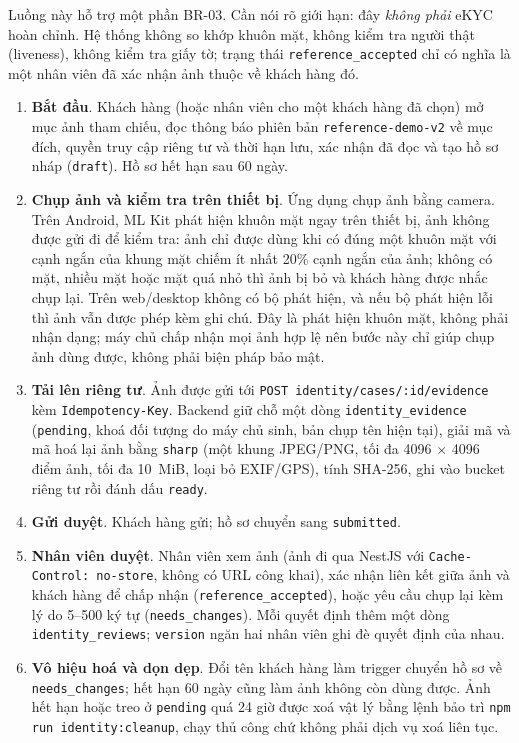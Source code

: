 Luồng này hỗ trợ một phần BR-03. Cần nói rõ giới hạn: đây \emph{không phải} eKYC hoàn chỉnh. Hệ thống không so khớp khuôn mặt, không kiểm tra người thật (liveness), không kiểm tra giấy tờ; trạng thái \texttt{reference\_\allowbreak{}accepted} chỉ có nghĩa là một nhân viên đã xác nhận ảnh thuộc về khách hàng đó.
\begin{enumerate}
  \item \textbf{Bắt đầu}. Khách hàng (hoặc nhân viên cho một khách hàng đã chọn) mở mục ảnh tham chiếu, đọc thông báo phiên bản \texttt{reference-\allowbreak{}demo-\allowbreak{}v2} về mục đích, quyền truy cập riêng tư và thời hạn lưu, xác nhận đã đọc và tạo hồ sơ nháp (\texttt{draft}). Hồ sơ hết hạn sau 60 ngày.
  \item \textbf{Chụp ảnh và kiểm tra trên thiết bị}. Ứng dụng chụp ảnh bằng camera. Trên Android, ML Kit phát hiện khuôn mặt ngay trên thiết bị, ảnh không được gửi đi để kiểm tra: ảnh chỉ được dùng khi có đúng một khuôn mặt với cạnh ngắn của khung mặt chiếm ít nhất 20\% cạnh ngắn của ảnh; không có mặt, nhiều mặt hoặc mặt quá nhỏ thì ảnh bị bỏ và khách hàng được nhắc chụp lại. Trên web/desktop không có bộ phát hiện, và nếu bộ phát hiện lỗi thì ảnh vẫn được phép kèm ghi chú. Đây là phát hiện khuôn mặt, không phải nhận dạng; máy chủ chấp nhận mọi ảnh hợp lệ nên bước này chỉ giúp chụp ảnh dùng được, không phải biện pháp bảo mật.
  \item \textbf{Tải lên riêng tư}. Ảnh được gửi tới \texttt{POST identity/\allowbreak{}cases/\allowbreak{}:id/\allowbreak{}evidence} kèm \texttt{Idempotency-\allowbreak{}Key}. Backend giữ chỗ một dòng \texttt{identity\_\allowbreak{}evidence} (\texttt{pending}, khoá đối tượng do máy chủ sinh, bản chụp tên hiện tại), giải mã và mã hoá lại ảnh bằng \texttt{sharp} (một khung JPEG/PNG, tối đa 4096 $\times$ 4096 điểm ảnh, tối đa 10~MiB, loại bỏ EXIF/GPS), tính SHA-256, ghi vào bucket riêng tư rồi đánh dấu \texttt{ready}.
  \item \textbf{Gửi duyệt}. Khách hàng gửi; hồ sơ chuyển sang \texttt{submitted}.
  \item \textbf{Nhân viên duyệt}. Nhân viên xem ảnh (ảnh đi qua NestJS với \texttt{Cache-\allowbreak{}Control: no-\allowbreak{}store}, không có URL công khai), xác nhận liên kết giữa ảnh và khách hàng để chấp nhận (\texttt{reference\_\allowbreak{}accepted}), hoặc yêu cầu chụp lại kèm lý do 5--500 ký tự (\texttt{needs\_\allowbreak{}changes}). Mỗi quyết định thêm một dòng \texttt{identity\_\allowbreak{}reviews}; \texttt{version} ngăn hai nhân viên ghi đè quyết định của nhau.
  \item \textbf{Vô hiệu hoá và dọn dẹp}. Đổi tên khách hàng làm trigger chuyển hồ sơ về \texttt{needs\_\allowbreak{}changes}; hết hạn 60 ngày cũng làm ảnh không còn dùng được. Ảnh hết hạn hoặc treo ở \texttt{pending} quá 24 giờ được xoá vật lý bằng lệnh bảo trì \texttt{npm run identity:cleanup}, chạy thủ công chứ không phải dịch vụ xoá liên tục.

\end{enumerate}
